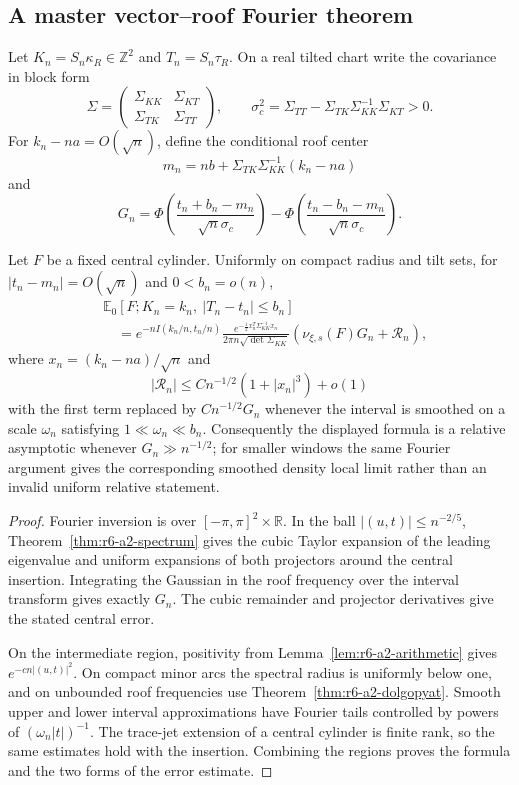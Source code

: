 \subsection{A master vector--roof Fourier theorem}

Let \(K_n=S_n\kappa_R\in\mathbb Z^2\) and
\(T_n=S_n\tau_R\).  On a real tilted chart write the covariance in block
form
\[
\Sigma=
\begin{pmatrix}\Sigma_{KK}&\Sigma_{KT}\\
\Sigma_{TK}&\Sigma_{TT}\end{pmatrix},
\qquad
\sigma_c^2=\Sigma_{TT}-\Sigma_{TK}\Sigma_{KK}^{-1}\Sigma_{KT}>0.
\]
For \(k_n-na=O(\sqrt n)\), define the conditional roof center
\[
m_n=nb+\Sigma_{TK}\Sigma_{KK}^{-1}(k_n-na)
\]
and
\[
G_n=\Phi\left(\frac{t_n+b_n-m_n}{\sqrt n\sigma_c}\right)
-\Phi\left(\frac{t_n-b_n-m_n}{\sqrt n\sigma_c}\right).
\]

\begin{theorem}
\label{thm:r6-a2-master-llt}
Let \(F\) be a fixed central cylinder.  Uniformly on compact radius and tilt
sets, for \(|t_n-m_n|=O(\sqrt n)\) and \(0<b_n=o(n)\),
\[
\begin{aligned}
&\mathbb E_0[F;K_n=k_n,\ |T_n-t_n|\le b_n]\\
&\quad=e^{-nI(k_n/n,t_n/n)}
\frac{e^{-\frac12x_n^T\Sigma_{KK}^{-1}x_n}}
{2\pi n\sqrt{\det\Sigma_{KK}}}
\left(\nu_{\xi,s}(F)G_n+\mathcal R_n\right),
\end{aligned}
\]
where \(x_n=(k_n-na)/\sqrt n\) and
\[
|\mathcal R_n|\le Cn^{-1/2}(1+|x_n|^3)+o(1)
\]
with the first term replaced by \(Cn^{-1/2}G_n\) whenever the interval is
smoothed on a scale \(\omega_n\) satisfying
\(1\ll\omega_n\ll b_n\).  Consequently the displayed formula is a relative
asymptotic whenever \(G_n\gg n^{-1/2}\); for smaller windows the same Fourier
argument gives the corresponding smoothed density local limit rather than an
invalid uniform relative statement.
\end{theorem}

\begin{proof}
Fourier inversion is over \([ -\pi,\pi]^2\times\mathbb R\).  In the ball
\(|(u,t)|\le n^{-2/5}\), Theorem~\ref{thm:r6-a2-spectrum} gives the cubic
Taylor expansion of the leading eigenvalue and uniform expansions of both
projectors around the central insertion.  Integrating the Gaussian in the
roof frequency over the interval transform gives exactly \(G_n\).  The cubic
remainder and projector derivatives give the stated central error.

On the intermediate region, positivity from
Lemma~\ref{lem:r6-a2-arithmetic} gives
\(e^{-cn|(u,t)|^2}\).  On compact minor arcs the spectral radius is uniformly
below one, and on unbounded roof frequencies use
Theorem~\ref{thm:r6-a2-dolgopyat}.  Smooth upper and lower interval
approximations have Fourier tails controlled by powers of
\((\omega_n|t|)^{-1}\).  The trace-jet extension of a central cylinder is
finite rank, so the same estimates hold with the insertion.  Combining the
regions proves the formula and the two forms of the error estimate.
\end{proof}

